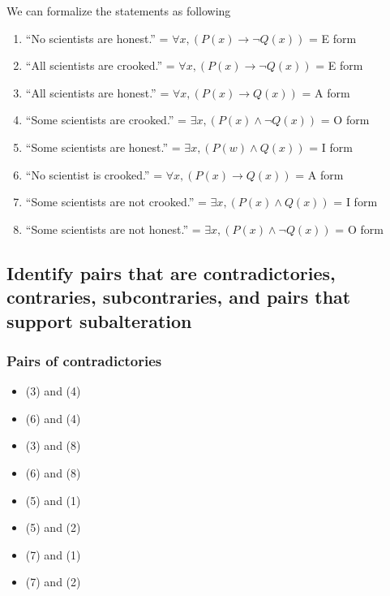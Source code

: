 We can formalize the statements as following

\begin{enumerate}
    \item ``No scientists are honest.'' = $\forall x, (P(x) \to \neg Q(x))$ = E form

    \item ``All scientists are crooked.'' = $\forall x, (P(x) \to \neg Q(x))$ = E form

    \item ``All scientists are honest.'' = $\forall x, (P(x) \to Q(x))$ = A form

    \item ``Some scientists are crooked.'' = $\exists x, (P(x) \wedge \neg Q(x))$ = O form

    \item ``Some scientists are honest.'' = $\exists x, (P(w) \wedge Q(x))$ = I form

    \item ``No scientist is crooked.'' = $\forall x, (P(x) \to Q(x))$ = A form

    \item ``Some scientists are not crooked.'' = $\exists x, (P(x) \wedge Q(x))$ = I form

    \item ``Some scientists are not honest.'' = $\exists x, (P(x) \wedge \neg Q(x))$ = O form
\end{enumerate}


\subsection{Identify pairs that are contradictories, contraries, subcontraries, and pairs that support subalteration}



\subsubsection{Pairs of contradictories}
\begin{itemize}
    \item (3) and (4)
    \item (6) and (4)
    \item (3) and (8)
    \item (6) and (8)
    \item (5) and (1)
    \item (5) and (2)
    \item (7) and (1)
    \item (7) and (2)
\end{itemize}


